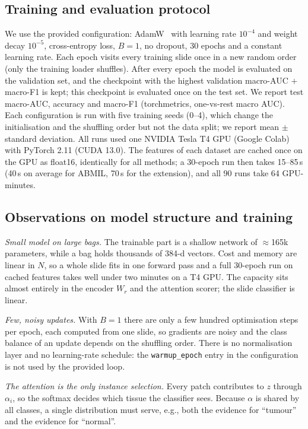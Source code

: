 \documentclass[conference]{IEEEtran}
\begin{document}
\subsection{Training and evaluation protocol}
We use the provided configuration: AdamW~\cite{loshchilov2019adamw} with learning rate $10^{-4}$ and weight decay $10^{-5}$, cross-entropy loss, $B{=}1$, no dropout, 30 epochs and a constant learning rate. Each epoch visits every training slide once in a new random order (only the training loader shuffles). After every epoch the model is evaluated on the validation set, and the checkpoint with the highest validation macro-AUC $+$ macro-F1 is kept; this checkpoint is evaluated once on the test set. We report test macro-AUC, accuracy and macro-F1 (torchmetrics, one-vs-rest macro AUC). Each configuration is run with five training seeds (0--4), which change the initialisation and the shuffling order but not the data split; we report mean $\pm$ standard deviation. All runs used one NVIDIA Tesla T4 GPU (Google Colab) with PyTorch 2.11 (CUDA 13.0). The features of each dataset are cached once on the GPU as float16, identically for all methods; a 30-epoch run then takes 15--85\,s (40\,s on average for ABMIL, 70\,s for the extension), and all 90 runs take 64 GPU-minutes.

\subsection{Observations on model structure and training}\label{sec:observations}
\emph{Small model on large bags.} The trainable part is a shallow network of $\approx$165k parameters, while a bag holds thousands of 384-d vectors. Cost and memory are linear in $N$, so a whole slide fits in one forward pass and a full 30-epoch run on cached features takes well under two minutes on a T4 GPU. The capacity sits almost entirely in the encoder $W_r$ and the attention scorer; the slide classifier is linear.

\emph{Few, noisy updates.} With $B{=}1$ there are only a few hundred optimisation steps per epoch, each computed from one slide, so gradients are noisy and the class balance of an update depends on the shuffling order. There is no normalisation layer and no learning-rate schedule: the \texttt{warmup\_epoch} entry in the configuration is not used by the provided loop.

\emph{The attention is the only instance selection.} Every patch contributes to $z$ through $\alpha_i$, so the softmax decides which tissue the classifier sees. Because $\alpha$ is shared by all classes, a single distribution must serve, e.g., both the evidence for ``tumour'' and the evidence for ``normal''.
\end{document}
